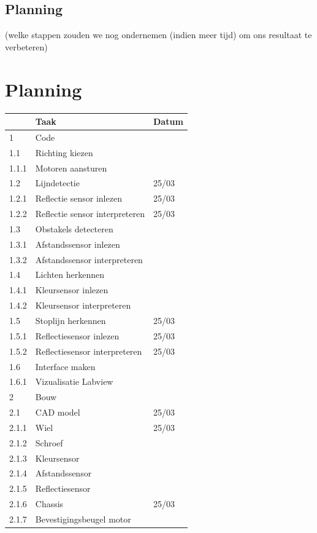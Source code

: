 \documentclass[twoside,kulak]{kulakreport} %
\begin{document}
	\subsection{Planning} %
	(welke stappen zouden we nog ondernemen (indien meer tijd) om ons resultaat te verbeteren)
	
	
	\section{Planning}
	\begin{tabular}{lll}
		& Taak & Datum \\ \hline
		1 & Code & \\
		1.1 & Richting kiezen & \\
		1.1.1 & Motoren aansturen & \\
		1.2 & Lijndetectie & 25/03 \\
		1.2.1 & Reflectie sensor inlezen & 25/03\\
		1.2.2 & Reflectie sensor interpreteren & 25/03 \\
		1.3 & Obstakels detecteren & \\
		1.3.1 & Afstandssensor inlezen & \\
		1.3.2 & Afstandssensor interpreteren & \\
		1.4 & Lichten herkennen & \\
		1.4.1 & Kleursensor inlezen & \\
		1.4.2 & Kleursensor interpreteren & \\
		1.5 & Stoplijn herkennen & 25/03\\
		1.5.1 & Reflectiesensor inlezen & 25/03\\
		1.5.2 & Reflectiesensor interpreteren & 25/03\\
		1.6 & Interface maken & \\
		1.6.1 & Vizualisatie Labview & \\
		\hline
		2 & Bouw & \\
		2.1 & CAD model & 25/03\\
		2.1.1 & Wiel & 25/03\\
		2.1.2 & Schroef & \\
		2.1.3 & Kleursensor & \\
		2.1.4 & Afstandssensor & \\
		2.1.5 & Reflectiesensor & \\
		2.1.6 & Chassis & 25/03\\
		2.1.7 & Bevestigingsbeugel motor & \\

\end{tabular}
\end{document}
